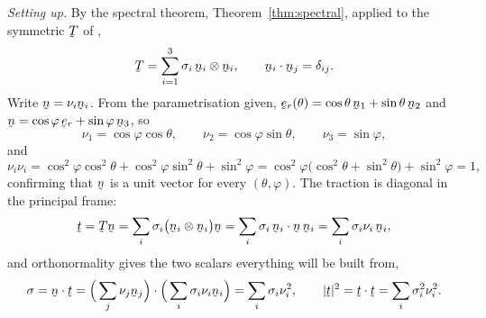\begin{solution}
\noindent\emph{Setting up.}
By the spectral theorem, Theorem~\ref{thm:spectral}, applied to the
symmetric $\bT$ of ,
\[
   \bT=\sum_{i=1}^{3}\sigma_{i}\,\bn_{i}\otimes\bn_{i} ,
   \qquad
   \ip{\bn_{i}}{\bn_{j}}=\dd_{ij} .
\]
Write $\bn=\nu_{i}\bn_{i}$. From the parametrisation given,
$\ber(\theta)=\cos\theta\,\bn_{1}+\sin\theta\,\bn_{2}$ and
$\bn=\cos\varphi\,\ber+\sin\varphi\,\bn_{3}$, so
\[
   \nu_{1}=\cos\varphi\cos\theta,\qquad
   \nu_{2}=\cos\varphi\sin\theta,\qquad
   \nu_{3}=\sin\varphi ,
\]
and
\[
   \nu_{i}\nu_{i}
   =\cos^{2}\varphi\cos^{2}\theta+\cos^{2}\varphi\sin^{2}\theta
     +\sin^{2}\varphi
   =\cos^{2}\varphi\big(\cos^{2}\theta+\sin^{2}\theta\big)
     +\sin^{2}\varphi
   =1 ,
\]
confirming that $\bn$ is a unit vector for every $(\theta,\varphi)$.
The traction is diagonal in the principal frame:
\[
   \bt=\bT\bn
   =\sum_{i}\sigma_{i}\big(\bn_{i}\otimes\bn_{i}\big)\bn
   =\sum_{i}\sigma_{i}\,\ip{\bn_{i}}\bn\,\bn_{i}
   =\sum_{i}\sigma_{i}\nu_{i}\,\bn_{i},
\]
and orthonormality gives the two scalars everything will be built from,
\[
   \sigma=\ip\bn\bt
   =\Big(\sum_{j}\nu_{j}\bn_{j}\Big)\cdot
    \Big(\sum_{i}\sigma_{i}\nu_{i}\bn_{i}\Big)
   =\sum_{i}\sigma_{i}\nu_{i}^{2},
   \qquad
   |\bt|^{2}=\ip\bt\bt=\sum_{i}\sigma_{i}^{2}\nu_{i}^{2}.
\]


\end{solution}
